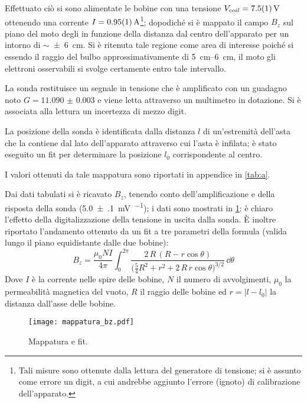 Effettuato ciò si sono alimentate le bobine con una tensione $V_{coil}= \SI{7.5 \pm 0.1}{\volt}$ ottenendo una corrente $I=\SI{0.95 \pm 0.01}{\ampere}$\footnote{Tali misure sono ottenute dalla lettura del generatore di tensione; si è assunto come errore un digit, a cui andrebbe aggiunto l'errore (ignoto) di calibrazione dell'apparato.}; dopodiché si è mappato il campo $B_z$ sul piano del moto degli \e in funzione della distanza dal centro dell'apparato per un intorno di $\sim $\SI{\pm 6}{\cm}.
Si è ritenuta tale regione come area di interesse poiché si essendo il raggio del bulbo approssimativamente di \SIrange{5}{6}{\cm}, il moto gli elettroni osservabili si svolge certamente entro tale intervallo.

La sonda restituisce un segnale in tensione che è amplificato con un guadagno noto
$G = \num{11.090(3)}$ e viene letta attraverso un multimetro in dotazione. Si è associata alla lettura un incertezza di mezzo digit.

La posizione della sonda è identificata dalla distanza $l$ di un'estremità dell'asta che la contiene dal lato dell'apparato attraverso cui l'asta è infilata; è stato eseguito un fit per determinare la posizione $l_0$ corrispondente al centro.

I valori ottenuti da tale mappatura sono riportati in appendice in \tablename{ \ref{tab:a}}.

Dai dati tabulati si è ricavato $B_z$, tenendo conto dell'amplificazione e della risposta della sonda (\SI{5.0(1)}{\mV\per\gauss}); i dati sono mostrati in \figurename{ \ref{fig:fit1}}: è chiaro l'effetto della digitalizzazione della tensione in uscita dalla sonda. È inoltre riportato l'andamento ottenuto da un fit a tre parametri della formula (valida lungo il piano equidistante dalle due bobine):
\begin{equation} \label{eq:bz}
		B_z = \frac{\mu_0 N I}{4 \pi} \int_0^{2\pi} \frac{2\, R\, (R - r \cos\theta )}{\big(\frac{5}{4} R^2 + r^2 + 2\, R \, r \cos \theta\big) ^ {3/2}} \, \dd \theta
\end{equation}
Dove $I$ è la corrente nelle spire delle bobine, $N$ il numero di avvolgimenti, $\mu_0$ la permeabilità magnetica del vuoto, $R$ il raggio delle bobine ed $r = |l - l_0|$ la distanza dall'asse delle bobine.


\begin{figure}[H]
	\centering
	\texttt{[image: mappatura\_bz.pdf]}
	\caption{Mappatura e fit.}
	\label{fig:fit1}
\end{figure}

